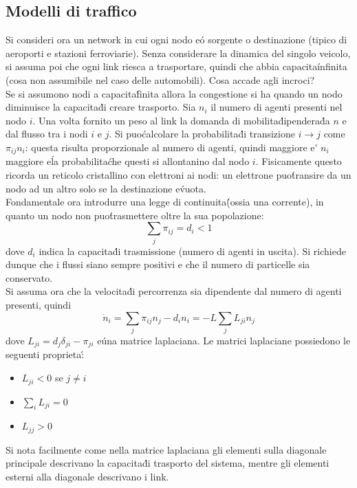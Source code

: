 \documentclass[12pt, a4paper]{book}
\theoremstyle{theorem}
\begin{document}
			\subsection{Modelli di traffico}
				Si consideri ora un network in cui ogni nodo e\' o sorgente o destinazione (tipico di aeroporti e stazioni ferroviarie).
				Senza considerare la dinamica del singolo veicolo, si assuma poi che ogni link riesca a trasportare, quindi che abbia capacita\' infinita (cosa non assumibile nel caso delle automobili).
				Cosa accade agli incroci?\\
				Se si assumono nodi a capacita\' finita allora la congestione si ha quando un nodo diminuisce la capacita\' di creare trasporto.
				Sia $n_i$ il numero di agenti presenti nel nodo $i$.
				Una volta fornito un peso al link la domanda di mobilita\' dipendera\' da $n$ e dal flusso tra i nodi $i$ e $j$.
				Si puo\' calcolare la probabilita\' di transizione $i\to j$ come $\pi_{ij}n_i$: questa risulta proporzionale al numero di agenti, quindi maggiore e\' $n_i$ maggiore e\' la probabilita\' che questi si allontanino dal nodo $i$.
				Fisicamente questo ricorda un reticolo cristallino con elettroni ai nodi: un elettrone puo\' transire da un nodo ad un altro solo se la destinazione e\' vuota.\\
				Fondamentale ora introdurre una legge di continuita\' (ossia una corrente), in quanto un nodo non puo\' trasmettere oltre la sua popolazione:
				\begin{equation}
					\sum_j\pi_{ij}=d_i<1
				\end{equation}
				dove $d_i$ indica la capacita\' di trasmissione (numero di agenti in uscita).
				Si richiede dunque che i flussi siano sempre positivi e che il numero di particelle sia conservato.\\
				Si assuma ora che la velocita\' di percorrenza sia dipendente dal numero di agenti presenti, quindi
				\begin{equation*}
					\dot{n}_i=\sum_j\pi_{ij}n_j-d_in_i=-L\sum_jL_{ji}n_j
				\end{equation*}
				dove $L_{ji}=d_j\delta_{ji}-\pi_{ji}$ e\' una matrice laplaciana.
				Le matrici laplaciane possiedono le seguenti proprieta\':
				\begin{itemize}
					\item $L_{ji}<0$ se $j\neq i$
					\item $\sum_iL_{ji}=0$
					\item $L_{jj}>0$
				\end{itemize}
				Si nota facilmente come nella matrice laplaciana gli elementi sulla diagonale principale descrivano la capacita\' di trasporto del sistema, mentre gli elementi esterni alla diagonale descrivano i link.
\end{document}
